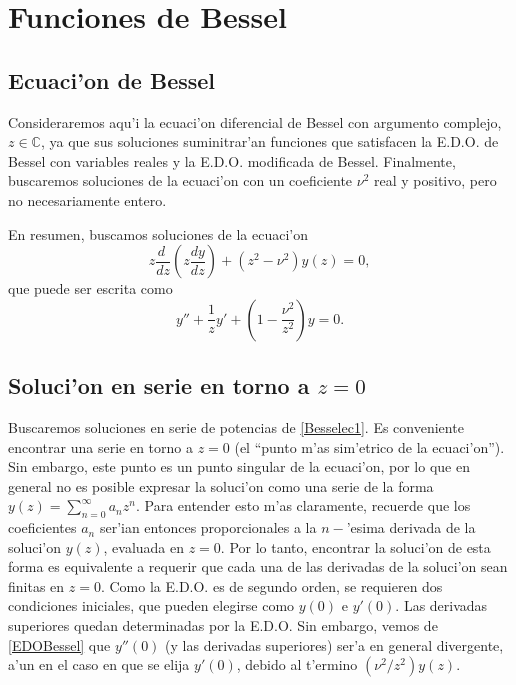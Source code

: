 \chapter{Funciones de Bessel}
\section{Ecuaci'on de Bessel}
Consideraremos aqu'i la ecuaci'on diferencial de Bessel con argumento complejo, $z\in\mathbb{C}$, ya que sus soluciones suminitrar'an funciones que satisfacen la E.D.O. de Bessel con variables reales y la E.D.O. modificada de Bessel. Finalmente, buscaremos soluciones de la ecuaci'on con un coeficiente $\nu^ 2$ real y positivo, pero no necesariamente entero.

En resumen, buscamos soluciones de la ecuaci'on
\begin{equation}\label{Besselec1}
z\frac{d\ }{dz}\left(z\frac{dy}{dz}\right)+(z^2-\nu^2)y(z)=0,
\end{equation}
que puede ser escrita como
\begin{equation}\label{EDOBessel}
y'' + \frac{1}{z} y' + \left( 1 - \frac{\nu^2}{z^2} \right)y = 0.
\end{equation}


\section{Soluci'on en serie en torno a $z = 0$}\label{secsolBess}
Buscaremos soluciones en serie de potencias de \eqref{Besselec1}. Es conveniente encontrar una serie en torno a $z=0$ (el ``punto m'as sim'etrico de la ecuaci'on''). Sin embargo, este punto es un punto singular de la ecuaci'on, por lo que en general no es posible expresar la soluci'on como una serie de la forma $y(z) = \sum_{n=0}^\infty a_n z^n$. Para entender esto m'as claramente, recuerde que los coeficientes $a_n$ ser'ian entonces proporcionales a la $n-$'esima derivada de la soluci'on $y(z)$, evaluada en $z=0$. Por lo tanto, encontrar la soluci'on de esta forma es equivalente a requerir que cada una de las derivadas de la soluci'on sean finitas en $z=0$. Como la E.D.O. es de segundo orden, se requieren dos condiciones iniciales, que pueden elegirse como $y(0)$ e $y'(0)$. Las derivadas superiores quedan determinadas por la E.D.O. Sin embargo, vemos de 
\eqref{EDOBessel} que $y''(0)$ (y las derivadas superiores) ser'a en general divergente, a'un en el caso en que se elija $y'(0)$, debido al t'ermino $({\nu^2}/{z^2})y(z)$. 

